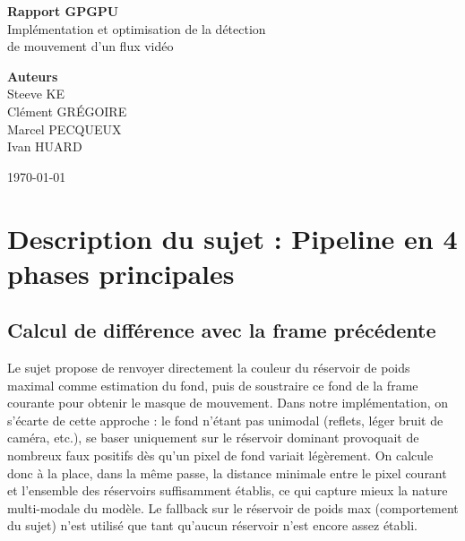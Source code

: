 \documentclass[12pt]{article}
\begin{document}
    \begin{titlepage}
        \centering
        \pagestyle{empty}
        \vspace*{1.5cm}

        {\huge \textbf{Rapport GPGPU}}\\[0.6cm]
        {\Large Implémentation et optimisation de la détection\\ de mouvement d'un flux vidéo}\\[0.5cm]

        \vfill

        {\large \textbf{Auteurs}}\\[0.6cm]
        {\large
        Steeve KE\\[0.15cm]
        Clément GRÉGOIRE\\[0.15cm]
        Marcel PECQUEUX\\[0.15cm]
        Ivan HUARD
        }

        \vfill

        {\large \today}

        \vspace*{1cm}
    \end{titlepage}

    \newpage
    \tableofcontents
    \newpage

    \section{Description du sujet : Pipeline en 4 phases principales}

    \subsection{Calcul de différence avec la frame précédente}
    Le sujet propose de renvoyer directement la couleur du réservoir de poids maximal comme estimation du fond, puis de soustraire ce fond de la frame courante pour obtenir le masque de mouvement. Dans notre implémentation, on s'écarte de cette approche : le fond n'étant pas unimodal (reflets, léger bruit de caméra, etc.), se baser uniquement sur le réservoir dominant provoquait de nombreux faux positifs dès qu'un pixel de fond variait légèrement. On calcule donc à la place, dans la même passe, la distance minimale entre le pixel courant et l'ensemble des réservoirs suffisamment établis, ce qui capture mieux la nature multi-modale du modèle. Le fallback sur le réservoir de poids max (comportement du sujet) n'est utilisé que tant qu'aucun réservoir n'est encore assez établi.
\end{document}
